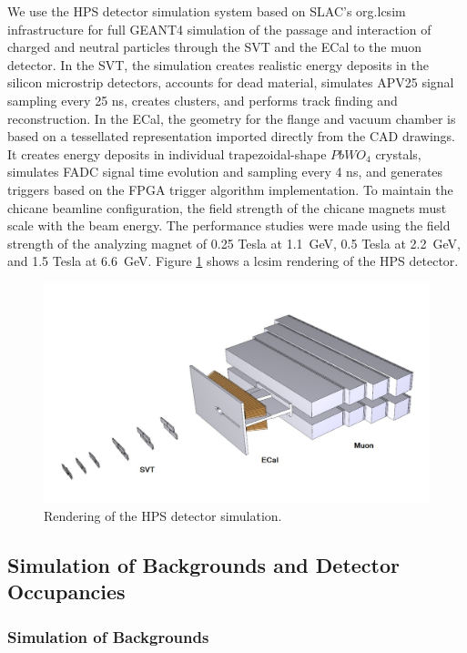 We use the HPS detector simulation system based on SLAC's org.lcsim infrastructure for full GEANT4
simulation of the passage and interaction of charged and neutral particles through the SVT 
and the ECal to the muon detector. In the SVT, the simulation creates realistic energy deposits in the silicon 
microstrip detectors, accounts for dead material, simulates APV25 signal sampling every 25 ns, 
creates clusters, and performs track finding and reconstruction.
In the ECal, the geometry for the flange and vacuum chamber is based on a tessellated 
representation imported directly from the CAD drawings. It creates energy deposits in individual 
trapezoidal-shape $PbWO_4$ crystals, simulates FADC signal time evolution and sampling every 4 ns, and 
generates triggers based on the  FPGA trigger algorithm implementation.
To maintain the chicane beamline configuration, the field strength of the
chicane magnets must scale with the beam energy. The performance studies were 
made using the field strength of the 
analyzing magnet of 0.25 Tesla at 1.1~GeV, 0.5 Tesla at 2.2~GeV, and 
1.5 Tesla at 6.6~GeV.
Figure  \ref{fig:lcsim} shows a lcsim rendering of the HPS detector.

\begin{figure}[ht]
\includegraphics[width=\textwidth]{performance/lcsimDetector}
\caption{\small{ Rendering of the HPS detector simulation.}}
\label{fig:lcsim}
\end{figure}

\subsection{Simulation of Backgrounds and Detector Occupancies}

\subsubsection{Simulation of Backgrounds}
\label{sec:backgrounds}

